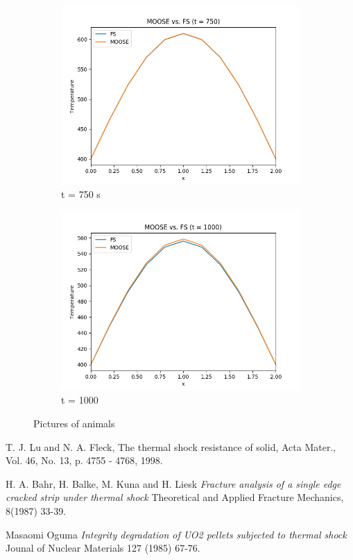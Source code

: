 \documentclass[12pt]{article}
\begin{document}
\begin{figure}[h]
    ~ %
    \begin{subfigure}[b]{0.4\textwidth}
        \includegraphics[width=\textwidth]{t750.png}
        \caption{t = 750 s}
        \label{fig:t750}
    \end{subfigure}
        \begin{subfigure}[b]{0.4\textwidth}
        \includegraphics[width=\textwidth]{t1000.png}
        \caption{t = 1000}
        \label{fig:t1000}
    \end{subfigure}
    \caption{Pictures of animals}\label{fig:T}
\end{figure}


\begin{thebibliography}{9}
T. J. Lu and N. A. Fleck, The thermal shock resistance of solid, Acta Mater., Vol. 46, No. 13, p. 4755 - 4768, 1998.
 
H. A. Bahr, H. Balke, M. Kuna and H. Liesk
\textit{Fracture analysis of a single edge cracked strip under thermal shock}
Theoretical and Applied Fracture Mechanics, 8(1987) 33-39.
 
Masaomi Oguma
\textit{Integrity degradation of UO2 pellets subjected to thermal shock}
Jounal of Nuclear Materials 127 (1985) 67-76.
\end{thebibliography}
\end{document}
